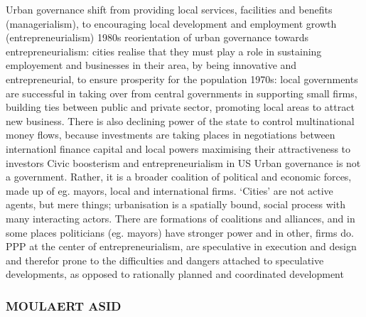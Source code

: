 \documentclass{article}
\begin{document}
\begin{outline}
	\1 Urban governance shift from providing local services, facilities and benefits (managerialism), to encouraging local development and employment growth (entrepreneurialism)
	\1 1980s reorientation of urban governance towards entrepreneurialism: cities realise that they must play a role in sustaining employement and businesses in their area, by being innovative and entrepreneurial, to ensure prosperity for the population
	\1 1970s: local governments are successful in taking over from central governments in supporting small firms, building ties between public and private sector, promoting local areas to attract new business. There is also declining power of the state to control multinational money flows, because investments are taking places in negotiations between internationl finance capital and local powers maximising their attractiveness to investors
		\2 Civic boosterism and entrepreneurialism in US
	\1 Urban governance is not a government. Rather, it is a broader coalition of political and economic forces, made up of eg. mayors, local and international firms.
		\2 `Cities' are not active agents, but mere things; urbanisation is a spatially bound, social process with many interacting actors. There are formations of coalitions and alliances, and in some places politicians (eg. mayors) have stronger power and in other, firms do.
	\1 PPP at the center of entrepreneurialism, are speculative in execution and design and therefor prone to the difficulties and dangers attached to speculative developments, as opposed to rationally planned and coordinated development	
\end{outline}

\subsubsection{MOULAERT ASID}
\end{document}
